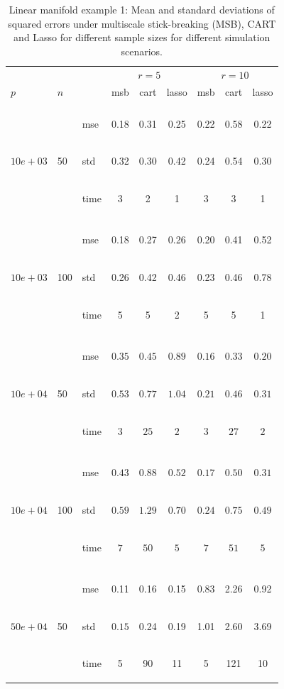 \documentclass{article} %
\newcommand{\efoo}{\end{footnotesize}}
\newcommand{\bfoo}{\begin{footnotesize}}
\begin{document}
\begin{table}[t]
\caption{Linear manifold example 1: Mean and standard deviations of squared errors under multiscale stick-breaking (MSB), CART and Lasso for different sample sizes for different simulation scenarios.}\label{table:linear1}
\vskip 0.15in
\begin{center}
\begin{small}
\begin{sc}
\begin{tabular}{lllcccccc}
\hline
&&&\multicolumn{3}{c}{$r=5$}&\multicolumn{3}{c}{$r=10$}\\
$p$&$n$& & msb&cart&lasso & msb&cart&lasso \\
\\
\multirow{3}{*}{$10e+03$}&\multirow{3}{*}{50}&\bfoo mse\efoo&0.18&0.31&0.25&0.22&0.58&0.22\\
&&\bfoo std\efoo &0.32&0.30&0.42&0.24&0.54&0.30\\
&&\bfoo time\efoo &3&2&1&3&3&1\\

\\
\multirow{3}{*}{$10e+03$}&\multirow{3}{*}{100}&\bfoo mse\efoo&0.18&0.27&0.26&0.20&0.41&0.52\\
&&\bfoo std\efoo & 0.26&0.42&0.46&0.23&0.46&0.78\\
&&\bfoo time\efoo &5&5& 2&5&5&1\\

\\
\multirow{3}{*}{$10e+04$}&\multirow{3}{*}{50}&\bfoo mse\efoo&$0.35$&$0.45$&$0.89$&$0.16$&$0.33$&$0.20$\\
&&\bfoo std\efoo &$0.53$ &$0.77$&$1.04$&$0.21$&$0.46$&$0.31$\\
&&\bfoo time\efoo &$3$&$25$&$2$&$3$&$27$&$2$\\
\\
\multirow{3}{*}{$10e+04$}&\multirow{3}{*}{100}&\bfoo mse\efoo&$0.43$&$0.88$&$0.52$&$0.17$&$0.50$&$0.31$\\
&&\bfoo std\efoo &$0.59$ &$1.29$&$0.70$&$0.24$ &$0.75$&$0.49$\\
&&\bfoo time\efoo &$7$&$50$&$5$&$7$&$51$&$5$\\
\\
\multirow{3}{*}{$50e+04$}&\multirow{3}{*}{50}&\bfoo mse\efoo&0.11&0.16&0.15&0.83&2.26&0.92\\
&&\bfoo std\efoo&$0.15$ &0.24&0.19&1.01&2.60&3.69\\
&&\bfoo time\efoo &5&90&11&5&121&10\\



\end{tabular}
\end{sc}
\end{small}
\end{center}
\end{table}
\end{document}
